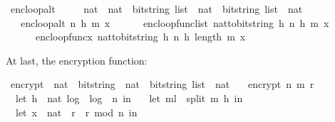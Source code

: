 \begin{isabellebody}
\isanewline
{}\isamarkupfalse%
\ enc{\isacharunderscore}{\kern0pt}loop{\isacharunderscore}{\kern0pt}alt\ \isanewline
\ \ \ {\isacharcolon}{\kern0pt}{\isacharcolon}{\kern0pt}\ {\isachardoublequoteopen}{\isacharparenleft}{\kern0pt}nat\ {\isasymtimes}\ nat\ {\isasymtimes}\ bitstring\ list{\isacharparenright}{\kern0pt}\ {\isasymRightarrow}\ nat\ {\isasymRightarrow}\ {\isacharparenleft}{\kern0pt}bitstring\ list\ {\isasymtimes}\ nat{\isacharparenright}{\kern0pt}{\isachardoublequoteclose}\ \isanewline
\ \ \ \isanewline
\ \ \ {\isachardoublequoteopen}enc{\isacharunderscore}{\kern0pt}loop{\isacharunderscore}{\kern0pt}alt\ {\isacharparenleft}{\kern0pt}n{\isacharcomma}{\kern0pt}\ h{\isacharcomma}{\kern0pt}\ m{\isacharparenright}{\kern0pt}\ x\ \isanewline
\ \ \ \ {\isacharequal}{\kern0pt}\ {\isacharparenleft}{\kern0pt}enc{\isacharunderscore}{\kern0pt}loop{\isacharunderscore}{\kern0pt}func{\isacharunderscore}{\kern0pt}list\ {\isacharparenleft}{\kern0pt}nat{\isacharunderscore}{\kern0pt}to{\isacharunderscore}{\kern0pt}bitstring\ h{\isacharcomma}{\kern0pt}\ n{\isacharcomma}{\kern0pt}\ h{\isacharcomma}{\kern0pt}\ m{\isacharparenright}{\kern0pt}\ x{\isacharcomma}{\kern0pt}\ \isanewline
\ \ \ \ \ \ enc{\isacharunderscore}{\kern0pt}loop{\isacharunderscore}{\kern0pt}func{\isacharunderscore}{\kern0pt}x\ {\isacharparenleft}{\kern0pt}nat{\isacharunderscore}{\kern0pt}to{\isacharunderscore}{\kern0pt}bitstring\ h{\isacharcomma}{\kern0pt}\ n{\isacharcomma}{\kern0pt}\ h{\isacharcomma}{\kern0pt}\ length\ m{\isacharparenright}{\kern0pt}\ x{\isacharparenright}{\kern0pt}{\isachardoublequoteclose}%
\begin{isamarkuptext}%
At last, the encryption function:%
\end{isamarkuptext}\isamarkuptrue%
\isamarkupfalse%
\ encrypt\ {\isacharcolon}{\kern0pt}{\isacharcolon}{\kern0pt}\ {\isachardoublequoteopen}nat\ {\isasymRightarrow}\ bitstring\ {\isasymRightarrow}\ nat\ {\isasymRightarrow}\ {\isacharparenleft}{\kern0pt}bitstring\ list\ {\isasymtimes}\ nat{\isacharparenright}{\kern0pt}{\isachardoublequoteclose}\ \isanewline
\ \ {\isachardoublequoteopen}encrypt\ n\ m\ r\ {\isacharequal}{\kern0pt}\ {\isacharparenleft}{\kern0pt}\isanewline
\ \ let\ h\ {\isacharequal}{\kern0pt}\ nat\ {\isasymlfloor}log\ {}\ {\isacharparenleft}{\kern0pt}log\ {}\ n{\isacharparenright}{\kern0pt}{\isasymrfloor}\ in\ \isanewline
\ \ let\ m{\isacharunderscore}{\kern0pt}l\ {\isacharequal}{\kern0pt}\ split\ m\ h\ in\ \isanewline
\ \ let\ {\isacharparenleft}{\kern0pt}x{\isacharunderscore}{\kern0pt}{}\ {\isacharcolon}{\kern0pt}{\isacharcolon}{\kern0pt}\ nat{\isacharparenright}{\kern0pt}\ {\isacharequal}{\kern0pt}\ {\isacharparenleft}{\kern0pt}r\ {\isacharasterisk}{\kern0pt}\ r{\isacharparenright}{\kern0pt}\ mod\ n\ in\ \isanewline

\end{isabellebody}
